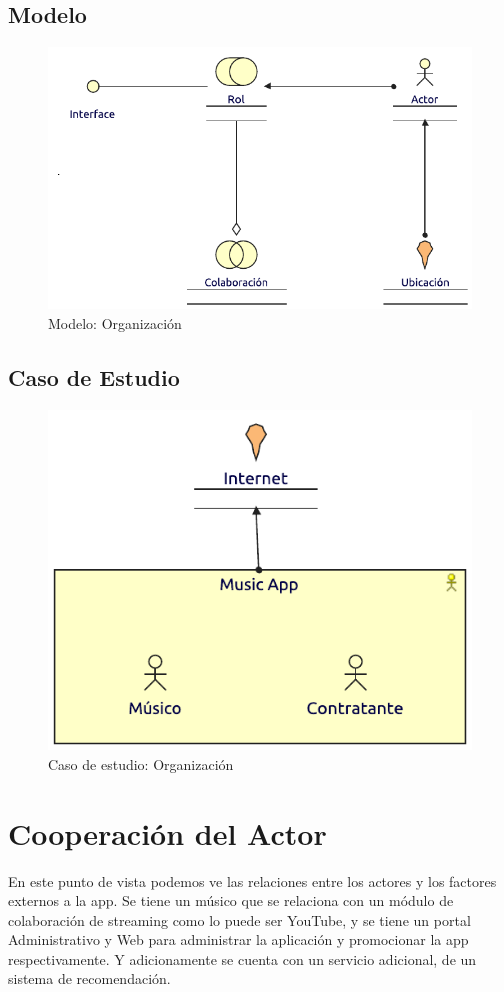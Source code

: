 \subsection{Modelo}
\begin{figure}[h!]
	\centering
	\includegraphics[width=\linewidth]{Arquitectura/Negocio/imgs/organizacion.pdf}
	\caption{Modelo:  Organización}
\end{figure}
\newpage
\subsection{Caso de Estudio}

\begin{figure}[h!]
	\centering
	\includegraphics[width=0.8\linewidth]{Arquitectura/Negocio/imgs/caso.pdf}
	\caption{Caso de estudio:  Organización}
\end{figure}

\newpage

\section{Cooperación del Actor}
En este punto de vista podemos ve las relaciones entre los actores y los factores externos a la app. Se tiene un músico que se relaciona con un módulo de colaboración de streaming como lo puede ser YouTube, y se tiene un portal Administrativo y Web para administrar la aplicación y promocionar la app respectivamente. Y adicionamente se cuenta con un servicio adicional, de un sistema de recomendación.
